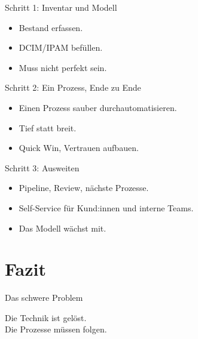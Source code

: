 \documentclass[aspectratio=1610,14pt]{beamer}
\newcommand{\hero}[1]{%
  \vfill
  \begin{center}
    {\sffamily #1\par}
  \end{center}
  \vfill
}
\begin{document}
  \begin{frame}{Schritt 1: Inventar und Modell}
    \begin{itemize}
      \item Bestand erfassen.
      \item DCIM/IPAM befüllen.
      \item Muss nicht perfekt sein.
    \end{itemize}
  \end{frame}

  \begin{frame}{Schritt 2: Ein Prozess, Ende zu Ende}
    \begin{itemize}
      \item Einen Prozess sauber durchautomatisieren.
      \item Tief statt breit.
      \item Quick Win, Vertrauen aufbauen.
    \end{itemize}
  \end{frame}

  \begin{frame}{Schritt 3: Ausweiten}
    \vspace{0.3em}
    \begin{itemize}
      \item Pipeline, Review, nächste Prozesse.
      \item Self-Service für Kund:innen und interne Teams.
      \item Das Modell wächst mit.
    \end{itemize}
  \end{frame}

  \section{Fazit}
  \begin{frame}{Das schwere Problem}
    \hero{Die Technik ist gelöst.\\
    Die Prozesse müssen folgen.}
  \end{frame}
\end{document}
